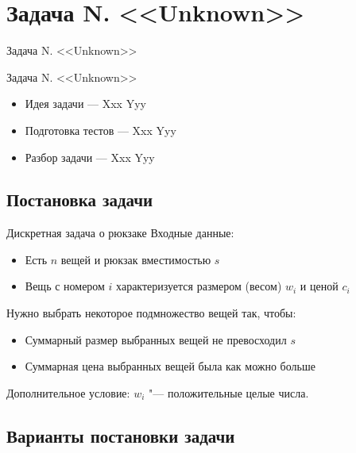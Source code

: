 \section{Задача N. <<Unknown>>}

\begin{frame}[t]{Задача N. <<Unknown>>}

  \begin{center}
    \LARGE Задача N. <<Unknown>>
  \end{center}

  \begin{itemize}
    \item Идея задачи --- Xxx Yyy
    \item Подготовка тестов --- Xxx Yyy
    \item Разбор задачи --- Xxx Yyy
  \end{itemize}
\end{frame}

\subsection{Постановка задачи}

\begin{frame}[t]{Дискретная задача о рюкзаке}
Входные данные:
\begin{itemize}
    \item Есть $n$ вещей и рюкзак вместимостью $s$
    \item Вещь с номером $i$ характеризуется размером (весом) $w_i$
     и ценой $c_i$
\end{itemize}
Нужно выбрать некоторое подмножество вещей так, чтобы:
\begin{itemize}
    \item Суммарный размер выбранных вещей не превосходил $s$
    \item Суммарная цена выбранных вещей была как можно больше
\end{itemize}
Дополнительное условие: $w_i$ "--- положительные целые числа.
\end{frame}

\subsection{Варианты постановки задачи}

